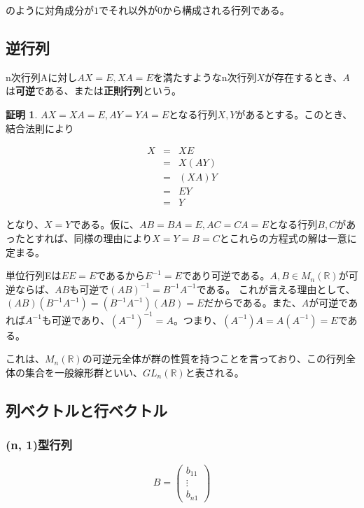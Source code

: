 \documentclass[dvipdfmx,autodetect-engine]{jsarticle}
\theoremstyle{definition}
\newtheorem*{Proof*}{証明}
\begin{document}
のように対角成分が$1$でそれ以外が$0$から構成される行列である。


\subsection{逆行列}

n次行列Aに対し$AX = E, XA = E$を満たすようなn次行列$X$が存在するとき、$A$は{\bf 可逆}である、または{\bf 正則行列}という。


\begin{Proof*}
$AX = XA = E, AY = YA = E$となる行列$X, Y$があるとする。このとき、結合法則により

\begin{eqnarray*}
X &= &XE \\
  &= &X(AY) \\
  &= &(XA)Y \\
  &= &EY \\
  &= &Y
\end{eqnarray*}

となり、$X = Y$である。仮に、$AB = BA = E, AC = CA = E$となる行列$B, C$があったとすれば、同様の理由により$X = Y = B = C$とこれらの方程式の解は一意に定まる。
\end{Proof*}


単位行列Eは$EE = E$であるから$E^{-1} = E$であり可逆である。$A, B \in M_n(\mathbb{R})$が可逆ならば、$AB$も可逆で$(AB)^{-1} = B^{-1}A^{-1}$である。
これが言える理由として、$(AB)(B^{-1}A^{-1}) = (B^{-1}A^{-1})(AB) = E$だからである。また、$A$が可逆であれば$A^{-1}$も可逆であり、$(A^{-1})^{-1} = A$。つまり、$(A^{-1})A = A(A^{-1}) = E$である。

これは、$M_n(\mathbb{R})$の可逆元全体が群の性質を持つことを言っており、この行列全体の集合を一般線形群といい、$GL_n(\mathbb{R})$と表される。

\subsection{列ベクトルと行ベクトル}

\subsubsection{(n, 1)型行列}

$$
B = \begin{pmatrix}
b_{11} \\
\vdots \\
b_{n1}
\end{pmatrix}
$$
\end{document}
